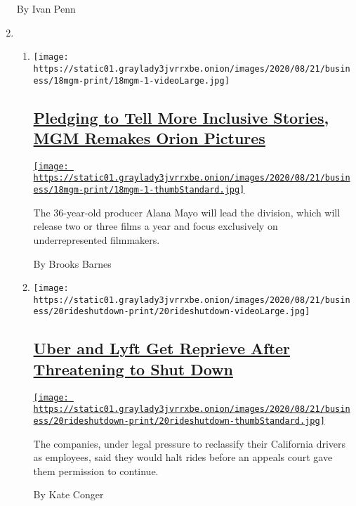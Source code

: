 \begin{enumerate}
  By Ivan Penn
\item
  \begin{enumerate}
  \def\labelenumii{\arabic{enumii}.}
  \item
    \texttt{[image: https://static01.graylady3jvrrxbe.onion/images/2020/08/21/business/18mgm-print/18mgm-1-videoLarge.jpg]}

    \hypertarget{pledging-to-tell-more-inclusive-stories-mgm-remakes-orion-pictures}{%
    \subsection{\texorpdfstring{\href{/2020/08/20/business/media/mgm-orion-pictures-alana-mayo.html}{Pledging
    to Tell More Inclusive Stories, MGM Remakes Orion
    Pictures}}{Pledging to Tell More Inclusive Stories, MGM Remakes Orion Pictures}}\label{pledging-to-tell-more-inclusive-stories-mgm-remakes-orion-pictures}}

    \href{/2020/08/20/business/media/mgm-orion-pictures-alana-mayo.html}{\texttt{[image: https://static01.graylady3jvrrxbe.onion/images/2020/08/21/business/18mgm-print/18mgm-1-thumbStandard.jpg]}}

    The 36-year-old producer Alana Mayo will lead the division, which
    will release two or three films a year and focus exclusively on
    underrepresented filmmakers.

    By Brooks Barnes
  \item
    \texttt{[image: https://static01.graylady3jvrrxbe.onion/images/2020/08/21/business/20rideshutdown-print/20rideshutdown-videoLarge.jpg]}

    \hypertarget{uber-and-lyft-get-reprieve-after-threatening-to-shut-down}{%
    \subsection{\texorpdfstring{\href{/2020/08/20/technology/uber-lyft-california-shutdown.html}{Uber
    and Lyft Get Reprieve After Threatening to Shut
    Down}}{Uber and Lyft Get Reprieve After Threatening to Shut Down}}\label{uber-and-lyft-get-reprieve-after-threatening-to-shut-down}}

    \href{/2020/08/20/technology/uber-lyft-california-shutdown.html}{\texttt{[image: https://static01.graylady3jvrrxbe.onion/images/2020/08/21/business/20rideshutdown-print/20rideshutdown-thumbStandard.jpg]}}

    The companies, under legal pressure to reclassify their California
    drivers as employees, said they would halt rides before an appeals
    court gave them permission to continue.

    By Kate Conger
  \end{enumerate}
\end{enumerate}

